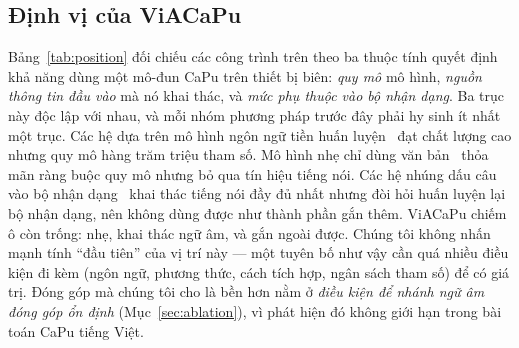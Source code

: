 \documentclass[conference,onecolumn]{IEEEtran}
\begin{document}
\subsection{Định vị của ViACaPu}
Bảng~\ref{tab:position} đối chiếu các công trình trên theo ba thuộc tính quyết định
khả năng dùng một mô-đun CaPu trên thiết bị biên: \emph{quy mô} mô hình,
\emph{nguồn thông tin đầu vào} mà nó khai thác, và \emph{mức phụ thuộc vào bộ nhận
dạng}. Ba trục này độc lập với nhau, và mỗi nhóm phương pháp trước đây phải hy sinh
ít nhất một trục. Các hệ dựa trên mô hình ngôn ngữ tiền huấn
luyện~\cite{bertpunct,jointcappunc,unipunc} đạt chất lượng cao nhưng quy mô hàng
trăm triệu tham số. Mô hình nhẹ chỉ dùng văn bản~\cite{you2024lightweight} thỏa mãn
ràng buộc quy mô nhưng bỏ qua tín hiệu tiếng nói. Các hệ nhúng dấu câu vào bộ nhận
dạng~\cite{stpt,kim2023,trinh2026} khai thác tiếng nói đầy đủ nhất nhưng đòi hỏi
huấn luyện lại bộ nhận dạng, nên không dùng được như thành phần gắn thêm.
ViACaPu chiếm ô còn trống: nhẹ, khai thác ngữ âm, và gắn ngoài được. Chúng tôi
không nhấn mạnh tính ``đầu tiên'' của vị trí này --- một tuyên bố như vậy cần
quá nhiều điều kiện đi kèm (ngôn ngữ, phương thức, cách tích hợp, ngân sách tham
số) để có giá trị. Đóng góp mà chúng tôi cho là bền hơn nằm ở \emph{điều kiện để
nhánh ngữ âm đóng góp ổn định} (Mục~\ref{sec:ablation}), vì phát hiện đó không
giới hạn trong bài toán CaPu tiếng Việt.
\end{document}
